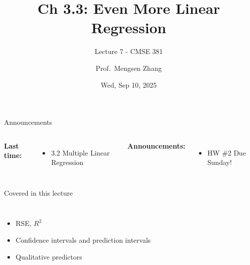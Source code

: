 \documentclass[aspectratio=169,usenames,dvipsnames]{beamer}
\begin{document}
\title[]{Ch 3.3: Even More Linear Regression}
\subtitle{Lecture 7 - CMSE 381}
\date{Wed, Sep 10, 2025}



\author[Dr.~Zhang]{Prof.~Mengsen Zhang}

\begin{frame}
 \titlepage


\end{frame}
\begin{frame}[c]{Announcements}

\begin{columns}
\centering

	\textbf{Last time:}
	\begin{itemize}
		\item 3.2 Multiple Linear Regression
	\end{itemize}
\centering

\textbf{Announcements:}
	\begin{itemize}
		\item HW \#2 Due Sunday!
	\end{itemize}
\end{columns}

\end{frame}
\begin{frame}[c]{Covered in this lecture }

\begin{columns}
\centering
\begin{itemize}
	\item RSE, $R^2$
	\item Confidence intervals and prediction intervals
	\item Qualitative predictors
\end{itemize}
\centering

\end{columns}

\end{frame}
\end{document}
